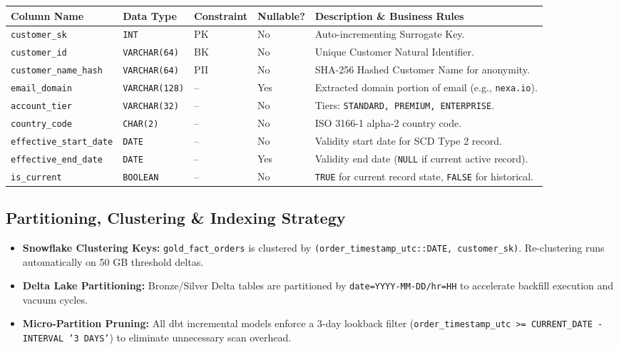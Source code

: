 \documentclass[10pt, a4paper]{article}
\begin{document}
\begin{tabularx}{\textwidth}{@{}p{2.8cm}p{2.2cm}p{1.4cm}p{1.2cm}L@{}}
\toprule
{}
\textbf{Column Name} & \textbf{Data Type} & \textbf{Constraint} & \textbf{Nullable?} & \textbf{Description \& Business Rules} \\
\midrule
\texttt{customer\_sk} & \texttt{INT} & PK & No & Auto-incrementing Surrogate Key. \\
\texttt{customer\_id} & \texttt{VARCHAR(64)} & BK & No & Unique Customer Natural Identifier. \\
\texttt{customer\_name\_hash} & \texttt{VARCHAR(64)} & PII & No & SHA-256 Hashed Customer Name for anonymity. \\
\texttt{email\_domain} & \texttt{VARCHAR(128)} & -- & Yes & Extracted domain portion of email (e.g., \texttt{nexa.io}). \\
\texttt{account\_tier} & \texttt{VARCHAR(32)} & -- & No & Tiers: \texttt{STANDARD, PREMIUM, ENTERPRISE}. \\
\texttt{country\_code} & \texttt{CHAR(2)} & -- & No & ISO 3166-1 alpha-2 country code. \\
\texttt{effective\_start\_date} & \texttt{DATE} & -- & No & Validity start date for SCD Type 2 record. \\
\texttt{effective\_end\_date} & \texttt{DATE} & -- & Yes & Validity end date (\texttt{NULL} if current active record). \\
\texttt{is\_current} & \texttt{BOOLEAN} & -- & No & \texttt{TRUE} for current record state, \texttt{FALSE} for historical. \\
\bottomrule
\end{tabularx}

\vspace{4pt}

\subsection{Partitioning, Clustering \& Indexing Strategy}
\begin{tcolorbox}[basebox, title=\faDatabase\ Warehouse Optimization Settings]
\scriptsize
\begin{itemize}[leftmargin=1.2em, itemsep=1pt, topsep=1pt]
    \item \textbf{Snowflake Clustering Keys:} \texttt{gold\_fact\_orders} is clustered by \texttt{(order\_timestamp\_utc::DATE, customer\_sk)}. Re-clustering runs automatically on 50 GB threshold deltas.
    \item \textbf{Delta Lake Partitioning:} Bronze/Silver Delta tables are partitioned by \texttt{date=YYYY-MM-DD/hr=HH} to accelerate backfill execution and vacuum cycles.
    \item \textbf{Micro-Partition Pruning:} All dbt incremental models enforce a 3-day lookback filter (\texttt{order\_timestamp\_utc >= CURRENT\_DATE - INTERVAL '3 DAYS'}) to eliminate unnecessary scan overhead.
\end{itemize}
\end{tcolorbox}
\end{document}

